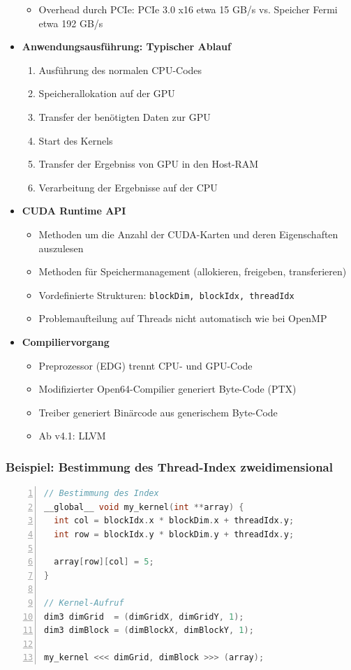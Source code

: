 \begin{itemize}
\begin{itemize}
		\item Overhead durch PCIe: PCIe 3.0 x16 etwa 15 GB/s vs. Speicher Fermi etwa 192 GB/s
	\end{itemize}
	\item \textbf{Anwendungsausführung: Typischer Ablauf}
	\begin{enumerate}
		\item Ausführung des normalen CPU-Codes
		\item Speicherallokation auf der GPU
		\item Transfer der benötigten Daten zur GPU
		\item Start des Kernels
		\item Transfer der Ergebniss von GPU in den Host-RAM
		\item Verarbeitung der Ergebnisse auf der CPU
	\end{enumerate}
	\item \textbf{CUDA Runtime API}
	\begin{itemize}
		\item Methoden um die Anzahl der CUDA-Karten und deren Eigenschaften auszulesen
		\item Methoden für Speichermanagement (allokieren, freigeben, transferieren)
		\item Vordefinierte Strukturen: \texttt{blockDim, blockIdx, threadIdx}
		\item Problemaufteilung auf Threads nicht automatisch wie bei OpenMP
	\end{itemize}
	\item \textbf{Compiliervorgang}
	\begin{itemize}
		\item Preprozessor (EDG) trennt CPU- und GPU-Code
		\item Modifizierter Open64-Compilier generiert Byte-Code (PTX)
		\item Treiber generiert Binärcode aus generischem Byte-Code
		\item Ab v4.1: LLVM
	\end{itemize}
\end{itemize}

\subsubsection{Beispiel: Bestimmung des Thread-Index zweidimensional}
\begin{minipage}{\linewidth}
\begin{lstlisting}[frame=single,numbers=left,mathescape,language=C]
// Bestimmung des Index
__global__ void my_kernel(int **array) {
  int col = blockIdx.x * blockDim.x + threadIdx.y;
  int row = blockIdx.y * blockDim.y + threadIdx.y;

  array[row][col] = 5;
}

// Kernel-Aufruf
dim3 dimGrid  = (dimGridX, dimGridY, 1);
dim3 dimBlock = (dimBlockX, dimBlockY, 1);

my_kernel <<< dimGrid, dimBlock >>> (array);
\end{lstlisting}
\end{minipage}

